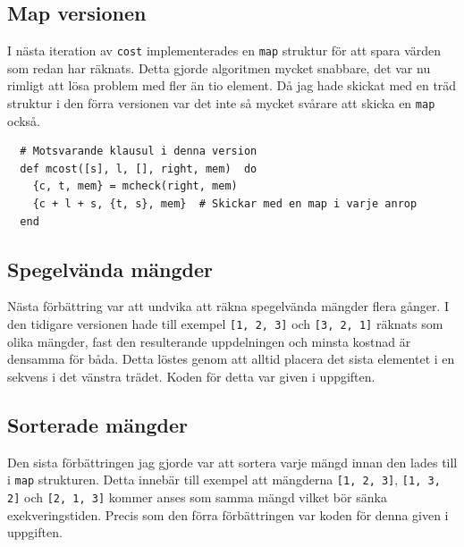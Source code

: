 \documentclass[a4paper,11pt]{article}
\begin{document}
\subsection*{Map versionen}
I nästa iteration av {\tt cost} implementerades en {\tt map} struktur för att spara värden som redan har räknats. Detta gjorde algoritmen mycket snabbare, det var nu rimligt att lösa problem med fler än tio element. Då jag hade skickat med en träd struktur i den förra versionen var det inte så mycket svårare att skicka en {\tt map} också.
\begin{verbatim}
  # Motsvarande klausul i denna version
  def mcost([s], l, [], right, mem)  do
    {c, t, mem} = mcheck(right, mem)
    {c + l + s, {t, s}, mem}  # Skickar med en map i varje anrop
  end
\end{verbatim}

\subsection*{Spegelvända mängder}
Nästa förbättring var att undvika att räkna spegelvända mängder flera gånger. I den tidigare versionen hade till exempel {\tt [1, 2, 3]} och {\tt [3, 2, 1]} räknats som olika mängder, fast den resulterande uppdelningen och minsta kostnad är densamma för båda. Detta löstes genom att alltid placera det sista elementet i en sekvens i det vänstra trädet. Koden för detta var given i uppgiften.
\subsection*{Sorterade mängder}
Den sista förbättringen jag gjorde var att sortera varje mängd innan den lades till i {\tt map} strukturen. Detta innebär till exempel att mängderna {\tt [1, 2, 3]}, {\tt [1, 3, 2]} och {\tt [2, 1, 3]} kommer anses som samma mängd vilket bör sänka exekveringstiden. Precis som den förra förbättringen var koden för denna given i uppgiften.

\pagebreak
\end{document}
